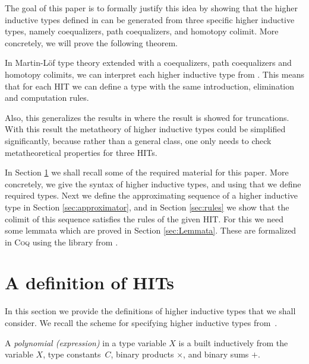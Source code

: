 \documentclass[a4paper,UKenglish]{lipics-v2016}
\begin{document}
The goal of this paper is to formally justify this idea by showing that the higher inductive types defined in \cite{basoldhigher} can be generated from three specific higher inductive types, namely coequalizers, path coequalizers, and homotopy colimit.
More concretely, we will prove the following theorem.
\begin{theorem}
\label{thm:three-hit}
In Martin-L\"of type theory extended with a coequalizers, path coequalizers and homotopy colimits, we can interpret each higher inductive type from \cite{basoldhigher}. 
This means that for each HIT we can define a type with the same introduction, elimination and computation rules.
\end{theorem}
Also, this generalizes the results in \cite{doorn2016constructing,kraus2014general,kraus2016constructions} where the result is showed for truncations.
With this result the metatheory of higher inductive types could be simplified significantly, because rather than a general class, one only needs to check metatheoretical properties for three HITs.

In Section \ref{sec:prelims} we shall recall some of the required material for this paper.
More concretely, we give the syntax of higher inductive types, and using that we define required types.
Next we define the approximating sequence of a higher inductive type in Section \ref{sec:approximator}, and in Section \ref{sec:rules} we show that the colimit of this sequence satisfies the rules of the given HIT.
For this we need some lemmata which are proved in Section \ref{sec:Lemmata}.
These are formalized in \textsc{Coq} \cite{CoqImpl} using the library from \cite{bauer2016hott}.

\section{A definition of HITs}
\label{sec:prelims}

In this section we provide the definitions of higher inductive types that we shall
consider. We recall the scheme for specifying higher inductive types
from~\cite{basoldhigher}.

\begin{definition}
  A \emph{polynomial (expression)} in a type variable $X$ is a built inductively from the
  variable $X$, type constants~$C$, binary products $\times$, and binary sums $+$.
\end{definition}
\end{document}
